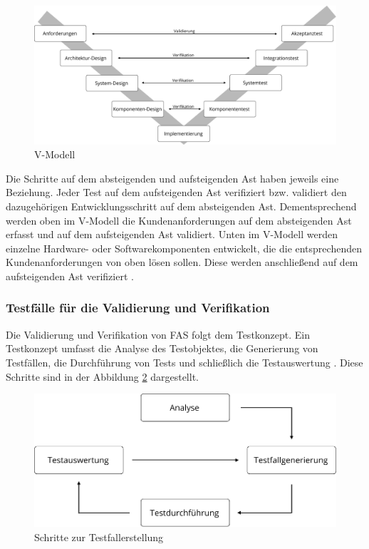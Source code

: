 \begin{figure}[h]
\centering
\includegraphics[scale=0.5]{images/v_modell.pdf}
\caption[V-Modell]{V-Modell \cite{hakuli2015virtuelle}}
\label{fig_v_modell}
\end{figure}

Die Schritte auf dem absteigenden und aufsteigenden Ast haben jeweils eine Beziehung. Jeder Test auf dem aufsteigenden Ast verifiziert bzw. validiert den dazugehörigen Entwicklungsschritt auf dem absteigenden Ast. Dementsprechend werden oben im V-Modell die Kundenanforderungen auf dem absteigenden Ast erfasst und auf dem aufsteigenden Ast validiert. Unten im V-Modell werden einzelne Hardware- oder Softwarekomponenten entwickelt, die die entsprechenden Kundenanforderungen von oben lösen sollen. Diese werden anschließend auf dem aufsteigenden Ast verifiziert \cite{hakuli2015virtuelle}.

\subsubsection{Testfälle für die Validierung und Verifikation}

Die Validierung und Verifikation von \ac{FAS} folgt dem Testkonzept. Ein Testkonzept umfasst die Analyse des Testobjektes, die Generierung von Testfällen, die Durchführung von Tests und schließlich die Testauswertung \cite{schuldt2013effiziente}. Diese Schritte sind in der Abbildung \ref{fig_testfallerstellung} dargestellt.

\begin{figure}[h]
\centering
\includegraphics[scale=0.7]{images/testfallerstellung.pdf}
\caption[Schritte zur Testfallerstellung]{Schritte zur Testfallerstellung \cite{schuldt2013effiziente}}
\label{fig_testfallerstellung}
\end{figure}

